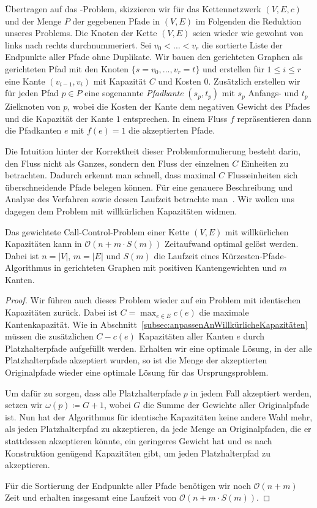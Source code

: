 Übertragen auf das \WeightedCallControl-Problem, skizzieren wir für das Kettennetzwerk $(V,E,c)$
und der Menge $P$ der gegebenen Pfade in $(V,E)$ im Folgenden die Reduktion unseres Problems.
Die Knoten der Kette $(V,E)$ seien wieder wie gewohnt von links nach rechts durchnummeriert.
Sei $v_0 < \dots < v_r$ die sortierte Liste der Endpunkte aller Pfade ohne Duplikate.
Wir bauen den gerichteten Graphen als gerichteten Pfad mit den Knoten $\{s = v_0, \dots, v_r=t\}$ und erstellen
für $1 \leq i \leq r$ eine Kante $(v_{i-1}, v_i)$ mit Kapazität $C$ und Kosten $0$.
Zusätzlich erstellen wir für jeden Pfad $p \in P$ eine sogenannte {\em Pfadkante} $(s_p, t_p)$ mit $s_p$ Anfangs- und $t_p$ Zielknoten von $p$,
wobei die Kosten der Kante dem negativen Gewicht des Pfades und die Kapazität der Kante $1$ entsprechen.
In einem Fluss $f$ repräsentieren dann die Pfadkanten $e$ mit $f(e)=1$ die akzeptierten Pfade.

Die Intuition hinter der Korrektheit dieser Problemformulierung besteht darin, den Fluss nicht als Ganzes, sondern
den Fluss der einzelnen $C$ Einheiten zu betrachten.
Dadurch erkennt man schnell, dass maximal $C$ Flusseinheiten sich überschneidende Pfade belegen können.
Für eine genauere Beschreibung und Analyse des Verfahren sowie dessen Laufzeit betrachte man~\cite{carlisle}.
Wir wollen uns dagegen dem Problem mit willkürlichen Kapazitäten widmen.

\begin{theorem}
    Das gewichtete Call-Control-Problem einer Kette $(V, E)$ mit willkürlichen Kapazitäten kann in $\mathcal O(n + m\cdot S(m))$
    Zeitaufwand optimal gelöst werden.
    Dabei ist $n = |V|$, $m=|E|$ und $S(m)$ die Laufzeit eines Kürzesten-Pfade-Algorithmus in gerichteten Graphen mit
    positiven Kantengewichten und $m$ Kanten.
\end{theorem}
\begin{proof}
    Wir führen auch dieses Problem wieder auf ein Problem mit identischen Kapazitäten zurück.
    Dabei ist $C = \max_{e \in E}c(e)$ die maximale Kantenkapazität.
    Wie in Abschnitt~\ref{subsec:anpassenAnWillkürlicheKapazitäten} müssen die zusätzlichen $C - c(e)$ Kapazitäten
    aller Kanten $e$ durch Platzhalterpfade aufgefüllt werden.
    Erhalten wir eine optimale Lösung, in der alle Platzhalterpfade akzeptiert wurden, so ist die Menge der akzeptierten
    Originalpfade wieder eine optimale Lösung für das Ursprungsproblem.

    Um dafür zu sorgen, dass alle Platzhalterpfade $p$ in jedem Fall akzeptiert werden, setzen wir
    $\omega(p) \coloneqq G + 1$, wobei $G$ die Summe der Gewichte aller Originalpfade ist.
    Nun hat der Algorithmus für identische Kapazitäten keine andere Wahl mehr, als jeden Platzhalterpfad zu akzeptieren,
    da jede Menge an Originalpfaden, die er stattdessen akzeptieren könnte, ein geringeres Gewicht hat und es nach
    Konstruktion genügend Kapazitäten gibt, um jeden Platzhalterpfad zu akzeptieren.

    Für die Sortierung der Endpunkte aller Pfade benötigen wir noch $\mathcal O(n+m)$ Zeit und erhalten insgesamt eine Laufzeit
    von $\mathcal O(n+m\cdot S(m))$.
\end{proof}

